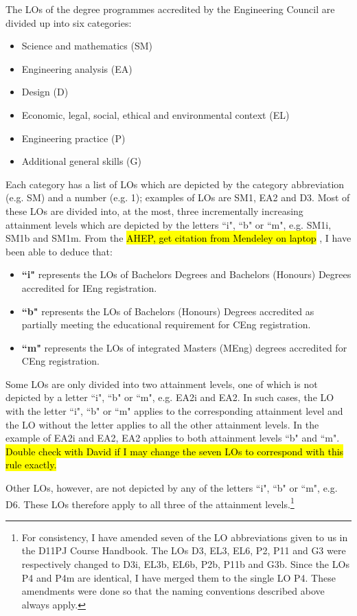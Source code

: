 The LOs of the degree programmes accredited by the Engineering Council are divided up into six categories:
\begin{itemize}
    \item Science and mathematics (SM)
    \item Engineering analysis (EA)
    \item Design (D)
    \item Economic, legal, social, ethical and environmental context (EL)
    \item Engineering practice (P)
    \item Additional general skills (G)
\end{itemize}
Each category has a list of LOs which are depicted by the category abbreviation (e.g. SM) and a number (e.g. 1); examples of LOs are SM1, EA2 and D3.
Most of these LOs are divided into, at the most, three incrementally increasing attainment levels which are depicted by the letters ``i", ``b" or ``m", e.g. SM1i, SM1b and SM1m.
From the \hl{AHEP, get citation from Mendeley on laptop} \citep{}, I have been able to deduce that:
\begin{itemize}
    \item \textbf{``i"} represents the LOs of Bachelors Degrees and Bachelors (Honours) Degrees accredited for IEng registration.
    \item \textbf{``b"} represents the LOs of Bachelors (Honours) Degrees accredited as partially meeting the educational requirement for CEng registration.
    \item \textbf{``m"} represents the LOs of integrated Masters (MEng) degrees accredited for CEng registration.
\end{itemize}

Some LOs are only divided into two attainment levels, one of which is not depicted by a letter ``i", ``b" or ``m", e.g. EA2i and EA2.
In such cases, the LO with the letter ``i", ``b" or ``m" applies to the corresponding attainment level and the LO without the letter applies to all the other attainment levels.
In the example of EA2i and EA2, EA2 applies to both attainment levels ``b" and ``m".
\hl{Double check with David if I may change the seven LOs to correspond with this rule exactly.}

Other LOs, however, are not depicted by any of the letters ``i", ``b" or ``m", e.g. D6.
These LOs therefore apply to all three of the attainment levels.\footnote{
For consistency, I have amended seven of the LO abbreviations given to us in the D11PJ Course Handbook.
The LOs D3, EL3, EL6, P2, P11 and G3 were respectively changed to D3i, EL3b, EL6b, P2b, P11b and G3b.
Since the LOs P4 and P4m are identical, I have merged them to the single LO P4.
These amendments were done so that the naming conventions described above always apply.}

